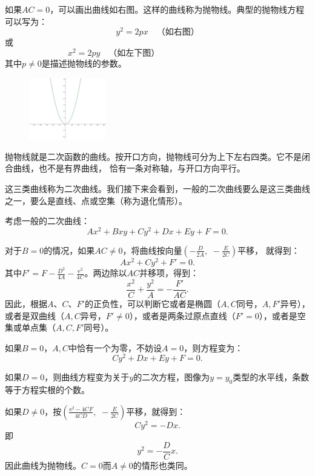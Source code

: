 \documentclass[12pt,UTF8]{ctexbook}
\newcommand{\e}{\mathrm{e}}
\theoremstyle{definition}
\theoremstyle{plain}
\begin{document}
如果$AC = 0$，可以画出曲线如右图。这样的曲线称为抛物线。典型的抛物线方程可以写为：
$$ y^2 = 2px  \quad \mbox{（如右图）} $$
或
$$ x^2 = 2py  \quad \mbox{（如左下图）} \qquad  \qquad  \qquad  \qquad\;\;\; \phantom{123}$$
其中$p \neq 0$是描述抛物线的参数。

\begin{figure} %
    \vspace{-30pt}
    \flushright
    \includegraphics[width=0.3\textwidth]{tu/抛物线2.png}
\end{figure}

抛物线就是二次函数的曲线。按开口方向，抛物线可分为上下左右四类。它不是闭合曲线，也不是有界曲线，
恰有一条对称轴，与开口方向平行。

这三类曲线称为二次曲线。我们接下来会看到，一般的二次曲线要么是这三类曲线之一，要么是直线、点或空集（称为退化情形）。

考虑一般的二次曲线：
$$ Ax^2 + Bxy + Cy^2 + Dx + Ey + F = 0.$$

对于$B = 0$的情况，如果$AC\neq 0$，将曲线按向量$\displaystyle\left(-\frac{D}{2A},\,\,-\frac{E}{2C}\right)$平移，
就得到：
$$ Ax^2 + Cy^2 + F' = 0.$$
其中$F' = F - \frac{D^2}{4A} - \frac{\e^2}{4C}$。两边除以$AC$并移项，得到：
$$ \frac{x^2}{C} + \frac{y^2}{A} = -\frac{F'}{AC}.$$
因此，根据$A$、$C$、$F'$的正负性，可以判断它或者是椭圆（$A,C$同号，$A,F'$异号），
或者是双曲线（$A,C$异号，$F' \neq 0$），或者是两条过原点直线（$F' = 0$），或者是空集或单点集（$A,C,F'$同号）。

如果$B = 0$，$A,C$中恰有一个为零，不妨设$A = 0$，则方程变为：
$$ Cy^2 + Dx + Ey + F = 0.$$

如果$D = 0$，则曲线方程变为关于$y$的二次方程，图像为$y = y_0$类型的水平线，条数等于方程实根的个数。

如果$D\neq 0$，按$\displaystyle\left(\frac{\e^2 - 4CF}{4CD},\,\,-\frac{E}{2C}\right)$平移，就得到：
$$ Cy^2 = -Dx. $$
即
$$ y^2 = -\frac{D}{C}x. $$
因此曲线为抛物线。$C=0$而$A\neq 0$的情形也类同。
\end{document}
